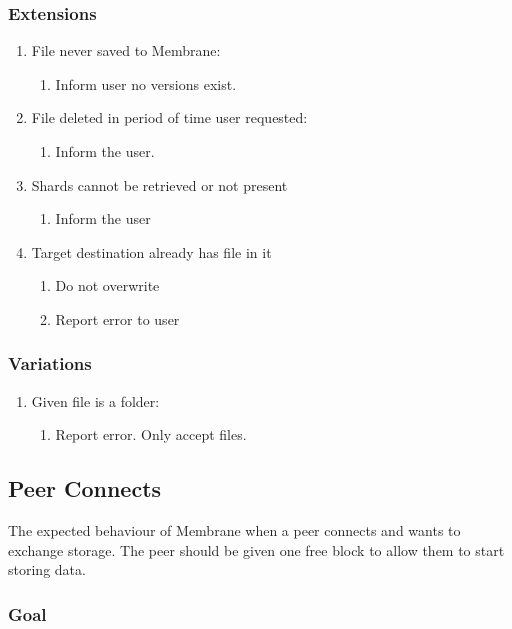 \documentclass[11pt, a4paper, twocolumn, twoside]{report}
\begin{document}
\subsubsection{Extensions}
\begin{enumerate}
  \item File never saved to Membrane:
	\begin{enumerate}
	  \item Inform user no versions exist.
	\end{enumerate}
  \item File deleted in period of time user requested:
	\begin{enumerate}
	  \item Inform the user.
	\end{enumerate}
  \item Shards cannot be retrieved or not present
	\begin{enumerate}
	  \item Inform the user
	\end{enumerate}
  \item Target destination already has file in it
	\begin{enumerate}
	  \item Do not overwrite
	  \item Report error to user
	\end{enumerate}
\end{enumerate}

\subsubsection{Variations}
\begin{enumerate}
  \item Given file is a folder:
	\begin{enumerate}
	  \item Report error. Only accept files.
	\end{enumerate}
\end{enumerate}

\subsection{Peer Connects}

The expected behaviour of Membrane when a peer connects and wants to exchange storage. The peer should be given one free block to allow them to start storing data.

\subsubsection{Goal}
\end{document}
